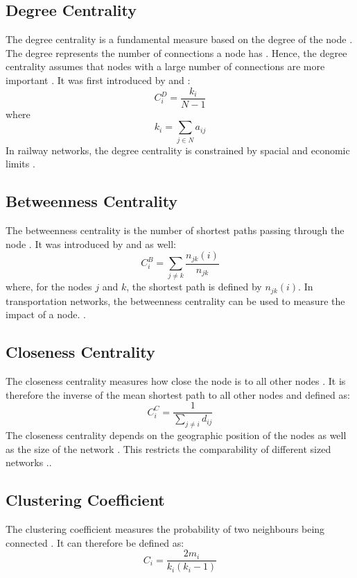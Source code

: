 \documentclass{Resources/netsci-project}
\begin{document}
\subsection{Degree Centrality}
The degree centrality is a fundamental measure based on the degree of the node \autocite{ComplexTopology}. The degree represents the number of connections a node has \autocite{ComplexTopology}. Hence, the degree centrality assumes that nodes with a large number of connections are more important \autocite{ComplexTopology}. It was first introduced by \textcite{Freeman} and \textcite{Freeman2}:
\begin{equation} \label{eqRestMass}
C_{i}^{D} = \dfrac{k_i}{N-1}
\end{equation}
where 
\begin{equation} \label{eqRestMass}
k_{i} = \sum_{j \in N}a_{ij}
\end{equation}
In railway networks, the degree centrality is constrained by spacial and economic limits \autocite{GraphSwiss}.

\subsection{Betweenness Centrality}
The betweenness centrality is the number of shortest paths passing through the node \autocite{ComplexTopology}. It was introduced  by \textcite{Freeman} and \textcite{Freeman2} as well:
\begin{equation} \label{eqRestMass}
C_{i}^{B} = \sum_{j \neq k} \dfrac{n_{jk}(i)}{n_{jk}}
\end{equation}
where, for the nodes $ j $ and $ k $, the shortest path is defined by $n_{jk}(i) $. In transportation networks, the betweenness centrality can be used to measure the impact of a node. \autocite{ComplexTopology}.

\subsection{Closeness Centrality}
The closeness centrality measures how close the node is to all other nodes \autocite{ComplexTopology}. It is therefore the inverse of the mean shortest path to all other nodes and defined as: \autocite{ComplexTopology}
\begin{equation} \label{eqRestMass}
C_{i}^{C} =\dfrac{1}{\sum_{j \neq i} d_{ij}}
\end{equation}
The closeness centrality depends on the geographic position of the nodes as well as the size of the network \autocite{GraphSwiss}. This restricts the comparability of different sized networks \autocite{GraphSwiss}..

\subsection{Clustering Coefficient}
The clustering coefficient measures the probability of two neighbours being connected \autocite{ComplexTopology}. It can therefore be defined as:
\begin{equation} \label{eqRestMass}
C_{i} =\dfrac{2m_i}{k_i(k_i -1)}
\end{equation}

\printbibliography
\end{document}
